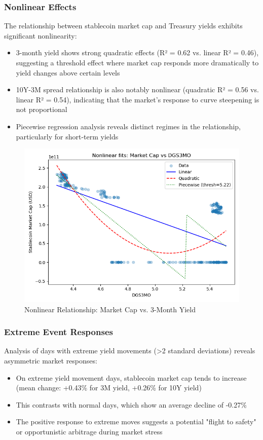 \documentclass[12pt,a4paper]{article}
\begin{document}
\subsubsection{Nonlinear Effects}
The relationship between stablecoin market cap and Treasury yields exhibits significant nonlinearity:
\begin{itemize}
    \item 3-month yield shows strong quadratic effects (R² = 0.62 vs. linear R² = 0.46), suggesting a threshold effect where market cap responds more dramatically to yield changes above certain levels
    \item 10Y-3M spread relationship is also notably nonlinear (quadratic R² = 0.56 vs. linear R² = 0.54), indicating that the market's response to curve steepening is not proportional
    \item Piecewise regression analysis reveals distinct regimes in the relationship, particularly for short-term yields
\end{itemize}

\begin{figure}[H]
    \centering
    \includegraphics[width=\columnwidth]{figures/nonlinear_marketcap_vs_DGS3MO.png}
    \caption{Nonlinear Relationship: Market Cap vs. 3-Month Yield}
    \label{fig:nonlinear}
\end{figure}

\subsubsection{Extreme Event Responses}
Analysis of days with extreme yield movements (>2 standard deviations) reveals asymmetric market responses:
\begin{itemize}
    \item On extreme yield movement days, stablecoin market cap tends to increase (mean change: +0.43\% for 3M yield, +0.26\% for 10Y yield)
    \item This contrasts with normal days, which show an average decline of -0.27\%
    \item The positive response to extreme moves suggests a potential "flight to safety" or opportunistic arbitrage during market stress
\end{itemize}
\end{document}
